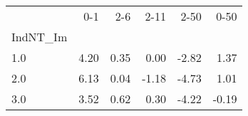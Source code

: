 \begin{tabular}{lrrrrr}
\toprule
{} &   0-1 &   2-6 &  2-11 &  2-50 &  0-50 \\
IndNT\_Im &       &       &       &       &       \\
\midrule
1.0      &  4.20 &  0.35 &  0.00 & -2.82 &  1.37 \\
2.0      &  6.13 &  0.04 & -1.18 & -4.73 &  1.01 \\
3.0      &  3.52 &  0.62 &  0.30 & -4.22 & -0.19 \\
\bottomrule
\end{tabular}
